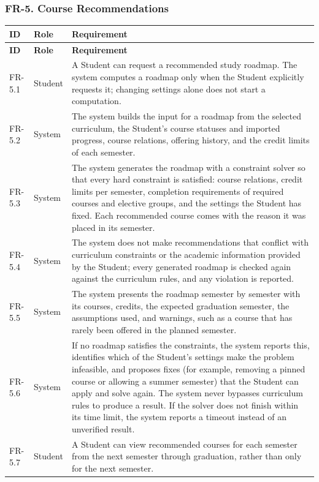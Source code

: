 \subsubsection{FR-5. Course Recommendations}
\begin{longtable}{|p{}|p{}|p{}|}
\hline
\textbf{ID} & \textbf{Role} & \textbf{Requirement} \\
\hline
\endfirsthead
\hline
\textbf{ID} & \textbf{Role} & \textbf{Requirement} \\
\hline
\endhead
FR-5.1 & Student & A Student can request a recommended study roadmap. The system computes a roadmap only when the Student explicitly requests it; changing settings alone does not start a computation. \\
\hline
FR-5.2 & System & The system builds the input for a roadmap from the selected curriculum, the Student's course statuses and imported progress, course relations, offering history, and the credit limits of each semester. \\
\hline
FR-5.3 & System & The system generates the roadmap with a constraint solver so that every hard constraint is satisfied: course relations, credit limits per semester, completion requirements of required courses and elective groups, and the settings the Student has fixed. Each recommended course comes with the reason it was placed in its semester. \\
\hline
FR-5.4 & System & The system does not make recommendations that conflict with curriculum constraints or the academic information provided by the Student; every generated roadmap is checked again against the curriculum rules, and any violation is reported. \\
\hline
FR-5.5 & System & The system presents the roadmap semester by semester with its courses, credits, the expected graduation semester, the assumptions used, and warnings, such as a course that has rarely been offered in the planned semester. \\
\hline
FR-5.6 & System & If no roadmap satisfies the constraints, the system reports this, identifies which of the Student's settings make the problem infeasible, and proposes fixes (for example, removing a pinned course or allowing a summer semester) that the Student can apply and solve again. The system never bypasses curriculum rules to produce a result. If the solver does not finish within its time limit, the system reports a timeout instead of an unverified result. \\
\hline
FR-5.7 & Student & A Student can view recommended courses for each semester from the next semester through graduation, rather than only for the next semester. \\

\end{longtable}

